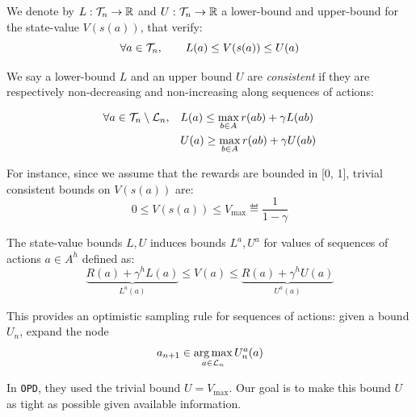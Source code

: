 \documentclass{article}
\begin{document}
\begin{definition}

We denote by $L:\mathcal{T}_n \rightarrow \mathbb{R}$ and  $U:\mathcal{T}_n \rightarrow \mathbb{R}$ a lower-bound and upper-bound for the state-value $V(s(a))$, that verify:
\begin{equation*}
    \forall a\in\mathcal{T}_n, \qquad L(a) \leq V(s(a)) \leq U(a)
\end{equation*}

We say a lower-bound $L$ and an upper bound $U$ are \emph{consistent} if they are respectively non-decreasing and non-increasing along sequences of actions:

\begin{align*}
\forall a\in\mathcal{T}_n\setminus\mathcal{L}_n, \quad &L(a) \leq \max_{b\in A} r(ab) + \gamma L(ab)\\
&U(a) \geq \max_{b\in A} r(ab) + \gamma U(ab)
\end{align*}

For instance, since we assume that the rewards are bounded in [0, 1], trivial consistent bounds on $V(s(a))$ are:
\[0 \leq V(s(a)) \leq V_{\max} \eqdef \frac{1}{1-\gamma} \]

The state-value bounds $L,U$ induces bounds $L^a, U^a$ for values of sequences of actions $a\in A^h$ defined as:
\begin{equation}
\label{eq:sequence_value}
    \underbrace{R(a) + \gamma^{h} L(a)}_{L^a(a)} \leq V(a) \leq \underbrace{R(a) + \gamma^{h} U(a)}_{U^a(a)}
\end{equation}
\end{definition}

This provides an optimistic sampling rule for sequences of actions: given a bound $U_n$, expand the node
\begin{equation}
    \label{eq:sampling_rule}
    a_{n+1} \in \operatorname*{arg\,max}_{a\in\mathcal{L}_n} U_n^a(a)
\end{equation}

In \texttt{OPD}, they used the trivial bound $U=V_{\max}$. Our goal is to make this bound $U$ as tight as possible given available information.
\end{document}
